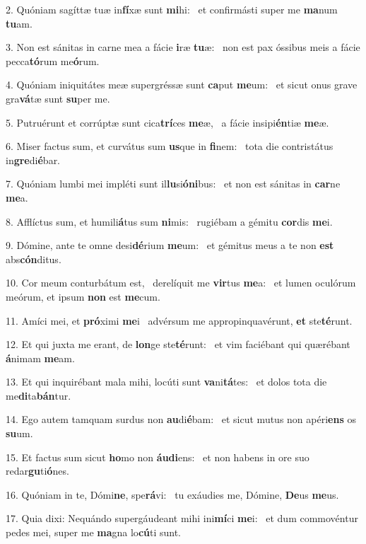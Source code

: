 2. Quóniam sagíttæ tuæ in\textbf{fí}xæ sunt \textbf{mi}hi: \ast\  et confirmásti super me \textbf{ma}num \textbf{tu}am.\

3. Non est sánitas in carne mea a fácie \textbf{i}ræ \textbf{tu}æ: \ast\  non est pax óssibus meis a fácie pecca\textbf{tó}rum me\textbf{ó}rum.\

4. Quóniam iniquitátes meæ supergréssæ sunt \textbf{ca}put \textbf{me}um: \ast\  et sicut onus grave gra\textbf{vá}tæ sunt \textbf{su}per me.\

5. Putruérunt et corrúptæ sunt cica\textbf{trí}ces \textbf{me}æ, \ast\  a fácie insipi\textbf{én}tiæ \textbf{me}æ.\

6. Miser factus sum, et curvátus sum \textbf{us}que in \textbf{fi}nem: \ast\  tota die contristátus in\textbf{gre}di\textbf{é}bar.\

7. Quóniam lumbi mei impléti sunt il\textbf{lu}si\textbf{ó}\textbf{ni}bus: \ast\  et non est sánitas in \textbf{car}ne \textbf{me}a.\

8. Afflíctus sum, et humili\textbf{á}tus sum \textbf{ni}mis: \ast\  rugiébam a gémitu \textbf{cor}dis \textbf{me}i.\

9. Dómine, ante te omne desi\textbf{dé}rium \textbf{me}um: \ast\  et gémitus meus a te non \textbf{est} abs\textbf{cón}ditus.\

10. Cor meum conturbátum est, \dag\  derelíquit me \textbf{vir}tus \textbf{me}a: \ast\  et lumen oculórum meórum, et ipsum \textbf{non} est \textbf{me}cum.\

11. Amíci mei, et \textbf{pró}ximi \textbf{me}i \ast\  advérsum me appropinquavérunt, \textbf{et} ste\textbf{té}runt.\

12. Et qui juxta me erant, de \textbf{lon}ge ste\textbf{té}runt: \ast\  et vim faciébant qui quærébant \textbf{á}nimam \textbf{me}am.\

13. Et qui inquirébant mala mihi, locúti sunt \textbf{va}ni\textbf{tá}tes: \ast\  et dolos tota die me\textbf{di}ta\textbf{bán}tur.\

14. Ego autem tamquam surdus non \textbf{au}di\textbf{é}bam: \ast\  et sicut mutus non apéri\textbf{ens} os \textbf{su}um.\

15. Et factus sum sicut \textbf{ho}mo non \textbf{áu}\textbf{di}ens: \ast\  et non habens in ore suo redar\textbf{gu}ti\textbf{ó}nes.\

16. Quóniam in te, Dómi\textbf{ne}, spe\textbf{rá}vi: \ast\  tu exáudies me, Dómine, \textbf{De}us \textbf{me}us.\

17. Quia dixi: Nequándo supergáudeant mihi ini\textbf{mí}ci \textbf{me}i: \ast\  et dum commovéntur pedes mei, super me \textbf{ma}gna lo\textbf{cú}ti sunt.\

